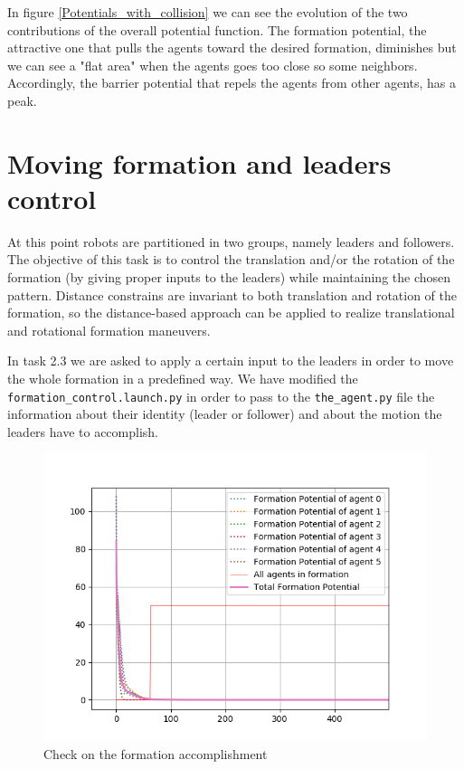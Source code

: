 \documentclass[a4paper,11pt,oneside]{book}
\begin{document}
In figure \ref{Potentials_with_collision} we can see the evolution of the two contributions of the overall potential function. The formation potential, the attractive one that pulls the agents toward the desired formation, diminishes but we can see a "flat area" when the agents goes too close so some neighbors. Accordingly, the barrier potential that repels the agents from other agents, has a peak.

\section{Moving formation and leaders control}
At this point robots are partitioned in two groups, namely leaders and followers. The objective of this task is to control the translation and/or the rotation of the formation (by giving proper inputs to the leaders) while maintaining the chosen pattern.
Distance constrains  are invariant to both translation and rotation of the formation, so the distance-based approach can be applied to realize translational and rotational formation maneuvers. 

In task 2.3 we are asked to apply a certain input to the leaders in order to move the whole formation in a predefined way. 
We have modified the \texttt{formation\_control.launch.py} in order to pass to the \texttt{the\_agent.py} file the information about their identity (leader or follower) and about the motion the leaders have to accomplish.

\begin{figure}[h]
\centering
	\includegraphics[scale=0.4]{Formation_check}
	\caption{Check on the formation accomplishment}
	\label{Check}
\end{figure}
\end{document}
